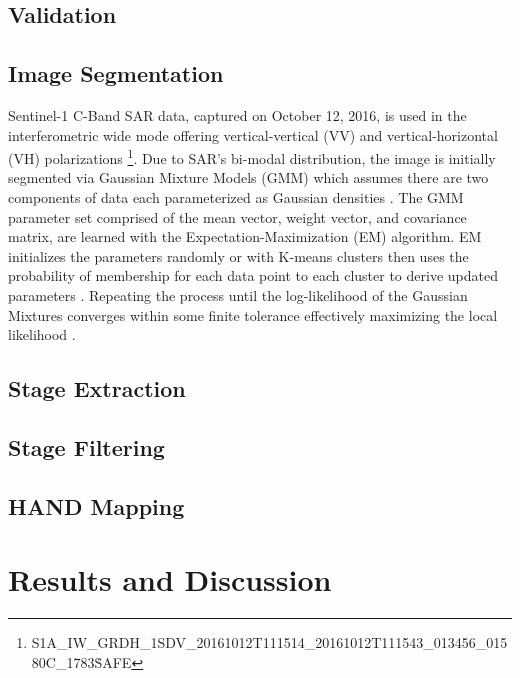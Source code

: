 \documentclass{article}
\begin{document}
\subsection{Validation}
\label{ssec:validation}



\subsection{Image Segmentation}
\label{ssec:image_segmentation}

Sentinel-1 C-Band SAR data, captured on October 12, 2016, is used in the interferometric wide mode offering vertical-vertical (VV) and vertical-horizontal (VH) polarizations \cite{copernicus2016sentinel} \footnote{S1A\_IW\_GRDH\_1SDV\_20161012T111514\_20161012T111543\_013456\_01580C\_1783\.SAFE}. 
Due to SAR's bi-modal distribution, the image is initially segmented via Gaussian Mixture Models (GMM) which assumes there are two components of data each parameterized as Gaussian densities \cite{reynolds2009gaussian,mclachlan2004finite}.
The GMM parameter set comprised of the mean vector, weight vector, and covariance matrix, are learned with the Expectation-Maximization (EM) algorithm. 
EM initializes the parameters randomly or with K-means clusters then uses the probability of membership for each data point to each cluster to derive updated parameters \cite{barazandeh2018behavior,dempster1977maximum}. 
Repeating the process until the log-likelihood of the Gaussian Mixtures converges within some finite tolerance effectively maximizing the local likelihood \cite{barazandeh2018behavior,dempster1977maximum}.

\subsection{Stage Extraction}
\label{ssec:stage_extraction}

\subsection{Stage Filtering}
\label{ssec:stage_filtering}

\subsection{HAND Mapping}
\label{ssec:hand_mapping}

\section{Results and Discussion}
\label{sec:results_and_discussion}
\end{document}
